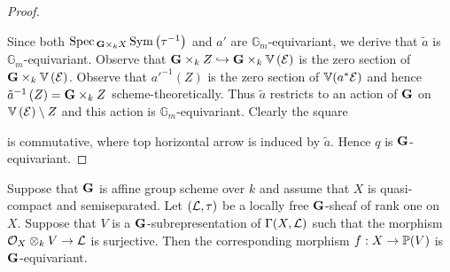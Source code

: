 \begin{proof}
\begin{center}
\end{center}
Since both $\mathrm{Spec}\,_{\mathbf{G}\times_kX}\,\textrm{Sym}\left(\tau^{-1}\right)$ and $a'$ are $\mathbb{G}_m$-equivariant, we derive that $\tilde{a}$ is $\mathbb{G}_m$-equivariant. Observe that $\mathbf{G}\times_kZ\hookrightarrow \mathbf{G}\times_k\mathbb{V}\left({\mathcal E}\right)$ is the zero section of $\mathbf{G}\times_k\mathbb{V}\left({\mathcal E}\right)$. Observe that $a'^{-1}(Z)$ is the zero section of $\mathbb{V}(a^*{\mathcal E})$ and hence $\tilde{a}^{-1}\left(Z\right) = \mathbf{G}\times_kZ$ scheme-theoretically. Thus $\tilde{a}$ restricts to an action of $\mathbf{G}$ on $\mathbb{V}\left({\mathcal E}\right)\setminus Z$ and this action is $\mathbb{G}_m$-equivariant. Clearly the square
\begin{center}
\end{center}
is commutative, where top horizontal arrow is induced by $\tilde{a}$. Hence $q$ is $\mathbf{G}$-equivariant. 
\end{proof}

\begin{corollary}
Suppose that $\mathbf{G}$ is affine group scheme over $k$ and assume that $X$ is quasi-compact and semiseparated. Let $({\mathcal L},\tau)$ be a locally free $\mathbf{G}$-sheaf of rank one on $X$. Suppose that $V$ is a $\mathbf{G}$-subrepresentation of $\Gamma(X,{\mathcal L})$ such that the morphism ${\mathcal O}_X\otimes_kV\rightarrow {\mathcal L}$ is surjective. Then the corresponding morphism $f:X\rightarrow \mathbb{P}(V)$ is $\mathbf{G}$-equivariant.
\end{corollary}



